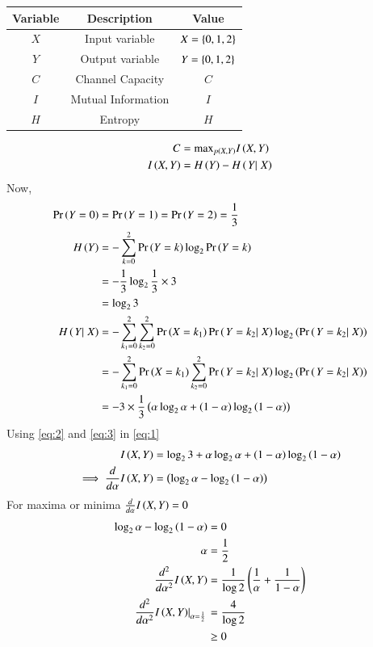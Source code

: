 \documentclass[article]{IEEEtran}
\theoremstyle{remark}
\begin{document}
\begin{tabular}{|c|c|c|} \hline
Variable & Description & Value\\\hline
$X$ & Input variable & $X = \left\{0,1,2\right\}$\\\hline
$Y$ & Output variable & $Y = \left\{0,1,2\right\}$\\\hline
$C$ & Channel Capacity & $C$\\\hline
$I$ & Mutual Information & $I$ \\\hline
$H$ & Entropy & $H$ \\\hline
\end{tabular}
\begin{align}
C &=\text{max}_{p\left(X,Y\right)} I\left(X,Y\right)\\
I\left(X,Y\right) &= H\left(Y\right) - H\left(\left.{Y}|\right.{X}\right)\label{eq:1}
\end{align}
Now,
\begin{align}
\Pr\left(Y=0\right) &= \Pr\left(Y=1\right) = \Pr\left(Y=2\right) =\frac{1}{3}\\
H\left(Y\right) &= - \sum_{k=0}^2\Pr\left(Y=k\right) \log_2\Pr\left(Y=k\right)\\
&= -\frac{1}{3}\log_2\frac{1}{3} \times 3\\
&= \log_23\label{eq:2}\\
H\left(\left.{Y}|\right.{X}\right) &= -\sum_{k_1=0}^2 \sum_{k_2=0}^2\Pr\left(X=k_1\right)\Pr\left(\left.{Y=k_2}|\right.{X}\right)\log_2\left(\Pr\left(\left.{Y=k_2}|\right.{X}\right)\right)\\
&=-\sum_{k_1=0}^2\Pr\left(X=k_1\right)\sum_{k_2=0}^2\Pr\left(\left.{Y=k_2}|\right.{X}\right)\log_2\left(\Pr\left(\left.{Y=k_2}|\right.{X}\right)\right)\\
&=-3\times\frac{1}{3}\left(\alpha\log_2\alpha+\left(1-\alpha\right)\log_2\left(1-\alpha\right)\right)\label{eq:3}
\end{align}
Using \eqref{eq:2} and \eqref{eq:3} in \eqref{eq:1}
\begin{align}
I\left(X,Y\right)&= \log_23 + \alpha\log_2\alpha+\left(1-\alpha\right)\log_2\left(1-\alpha\right)\\
\implies \frac{d}{d\alpha}I\left(X,Y\right) &= \left(\log_2 \alpha - \log_2\left(1-\alpha\right)\right)
\end{align}
For maxima or minima $\frac{d}{d\alpha}I\left(X,Y\right) = 0$
\begin{align}
\log_2 \alpha - \log_2\left(1-\alpha\right) &= 0\\
\alpha &= \frac{1}{2}\\
\frac{d^2}{d\alpha^2}I\left(X,Y\right) &= \frac{1}{\log 2}\left(\frac{1}{\alpha} + \frac{1}{1-\alpha}\right)\\
\left.{\frac{d^2}{d\alpha^2}I\left(X,Y\right)}|_{\alpha = \frac{1}{2}}\right. &= \frac{4}{\log 2} \\
&\geq 0
\end{align}
\end{document}
